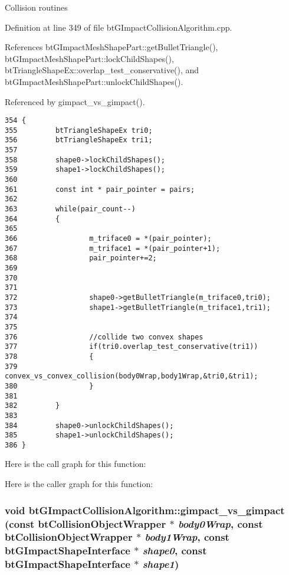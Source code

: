 Collision routines 

Definition at line 349 of file btGImpactCollisionAlgorithm.cpp.

References btGImpactMeshShapePart::getBulletTriangle(), btGImpactMeshShapePart::lockChildShapes(), btTriangleShapeEx::overlap\_\-test\_\-conservative(), and btGImpactMeshShapePart::unlockChildShapes().

Referenced by gimpact\_\-vs\_\-gimpact().

\begin{Code}\begin{verbatim}354 {
355         btTriangleShapeEx tri0;
356         btTriangleShapeEx tri1;
357 
358         shape0->lockChildShapes();
359         shape1->lockChildShapes();
360 
361         const int * pair_pointer = pairs;
362 
363         while(pair_count--)
364         {
365 
366                 m_triface0 = *(pair_pointer);
367                 m_triface1 = *(pair_pointer+1);
368                 pair_pointer+=2;
369 
370 
371 
372                 shape0->getBulletTriangle(m_triface0,tri0);
373                 shape1->getBulletTriangle(m_triface1,tri1);
374 
375 
376                 //collide two convex shapes
377                 if(tri0.overlap_test_conservative(tri1))
378                 {
379                         convex_vs_convex_collision(body0Wrap,body1Wrap,&tri0,&tri1);
380                 }
381 
382         }
383 
384         shape0->unlockChildShapes();
385         shape1->unlockChildShapes();
386 }
\end{verbatim}
\end{Code}




Here is the call graph for this function:

Here is the caller graph for this function:\hypertarget{classbt_g_impact_collision_algorithm_2a6bd5ca4d26e3578d2613543e85429b}{
\subsubsection[gimpact\_\-vs\_\-gimpact]{\setlength{\rightskip}{0pt plus 5cm}void btGImpactCollisionAlgorithm::gimpact\_\-vs\_\-gimpact (const btCollisionObjectWrapper $\ast$ {\em body0Wrap}, \/  const btCollisionObjectWrapper $\ast$ {\em body1Wrap}, \/  const {\bf btGImpactShapeInterface} $\ast$ {\em shape0}, \/  const {\bf btGImpactShapeInterface} $\ast$ {\em shape1})}}
\label{classbt_g_impact_collision_algorithm_2a6bd5ca4d26e3578d2613543e85429b}


